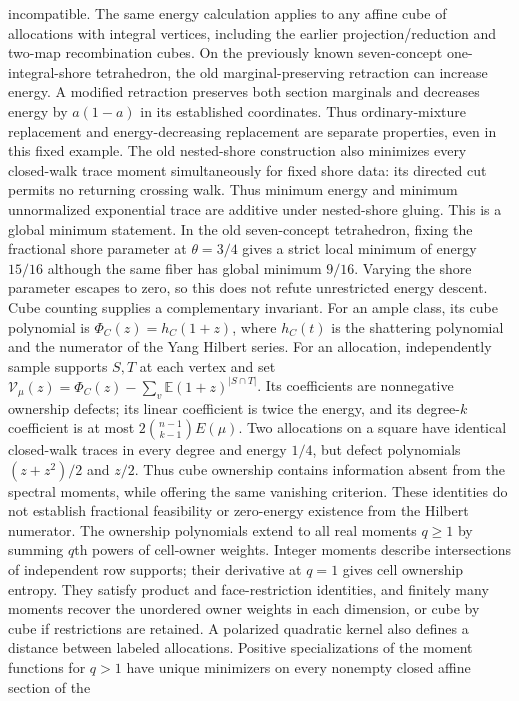 \documentclass[11pt]{article}
\theoremstyle{definition}
\begin{document}
incompatible.
The same energy calculation applies to any affine cube of allocations
with integral vertices, including the earlier projection/reduction and
two-map recombination cubes. On the previously known seven-concept
one-integral-shore tetrahedron, the old marginal-preserving retraction
can increase energy. A modified retraction preserves both section
marginals and decreases energy by $a(1-a)$ in its established coordinates.
Thus ordinary-mixture replacement and energy-decreasing replacement are
separate properties, even in this fixed example.
The old nested-shore construction also minimizes every closed-walk
trace moment simultaneously for fixed shore data: its directed cut permits
no returning crossing walk. Thus minimum energy and minimum unnormalized
exponential trace are additive under nested-shore gluing. This is a global
minimum statement. In the old seven-concept tetrahedron, fixing the
fractional shore parameter at $\theta=3/4$ gives a strict local minimum
of energy $15/16$ although the same fiber has global minimum $9/16$.
Varying the shore parameter escapes to zero, so this does not refute
unrestricted energy descent.
Cube counting supplies a complementary invariant. For an ample class,
its cube polynomial is $\Phi_C(z)=h_C(1+z)$, where $h_C(t)$ is the
shattering polynomial and the numerator of the Yang Hilbert series.
For an allocation, independently sample supports $S,T$ at each vertex
and set $\mathcal V_\mu(z)=\Phi_C(z)-\sum_v\mathbb E(1+z)^{|S\cap T|}$.
Its coefficients are nonnegative ownership defects; its linear coefficient
is twice the energy, and its degree-$k$ coefficient is at most
$2\binom{n-1}{k-1}E(\mu)$. Two allocations on a square have identical
closed-walk traces in every degree and energy $1/4$, but defect polynomials
$(z+z^2)/2$ and $z/2$. Thus cube ownership contains information absent
from the spectral moments, while offering the same vanishing criterion.
These identities do not establish fractional feasibility or zero-energy
existence from the Hilbert numerator.
The ownership polynomials extend to all real moments $q\geq1$ by
summing $q$th powers of cell-owner weights. Integer moments describe
intersections of independent row supports; their derivative at $q=1$
gives cell ownership entropy. They satisfy product and face-restriction
identities, and finitely many moments recover the unordered owner weights
in each dimension, or cube by cube if restrictions are retained.
A polarized quadratic kernel also defines a distance between labeled
allocations. Positive specializations of the moment functions for $q>1$
have unique minimizers on every nonempty closed affine section of the
\end{document}
